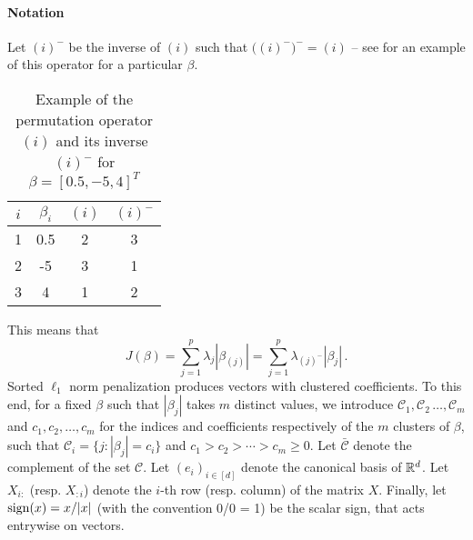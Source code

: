 \paragraph{Notation}\label{sec:notation}

Let \((i)^{-}\) be the inverse of \((i)\) such that
\(\big((i)^-\big)^- = (i)\) -- see  for an
example of this operator for a particular \(\beta\).
\begin{table}
  \centering
  \caption{Example of the permutation operator \((i)\) and its inverse
    \((i)^-\) for $\beta = [0.5, -5, 4]^T$}
    \label{tab:permutation-example}
  \begin{tabular}{cccc}
    \toprule
    \(i\) & \(\beta_i\) & \((i)\) & \((i)^-\) \\
    \midrule
    1     & 0.5         & 2       & 3         \\
    2     & -5          & 3       & 1         \\
    3     & 4           & 1       & 2         \\
    \bottomrule
  \end{tabular}
\end{table}
This means that
\[
  J(\beta) = \sum_{j=1}^p \lambda_j |\beta_{(j)}|
  = \sum_{j=1}^p \lambda_{(j)^-}|\beta_j| \,.
\]
Sorted $\ell_1$ norm penalization produces vectors with clustered coefficients.
To this end, for a fixed $\beta$ such that $|\beta_j|$ takes $m$ distinct values, we introduce \(\mathcal{C}_1, \mathcal{C}_2\, \dots, \mathcal{C}_m\) and \(c_1,
c_2, \dots, c_m\) for the indices and coefficients respectively of the \(m\)
clusters of $\beta$, such that
$\mathcal{C}_i = \{j : |\beta_j| = c_i\}$ and $c_1 > c_2 > \cdots > c_m \geq 0.$
Let \(\bar{\mathcal{C}}\) denote the complement of the set \(\mathcal{C}\).
Let $(e_i)_{i \in [d]}$ denote the canonical basis of $\mathbb{R}^d$.
Let $X_{i:}$ (resp. $X_{:i}$) denote the $i$-th row (resp. column) of the matrix $X$.
Finally, let $\operatorname{sign}(x) = x / |x|$ (with the convention 0/0 = 1) be the scalar sign, that acts entrywise on vectors.


